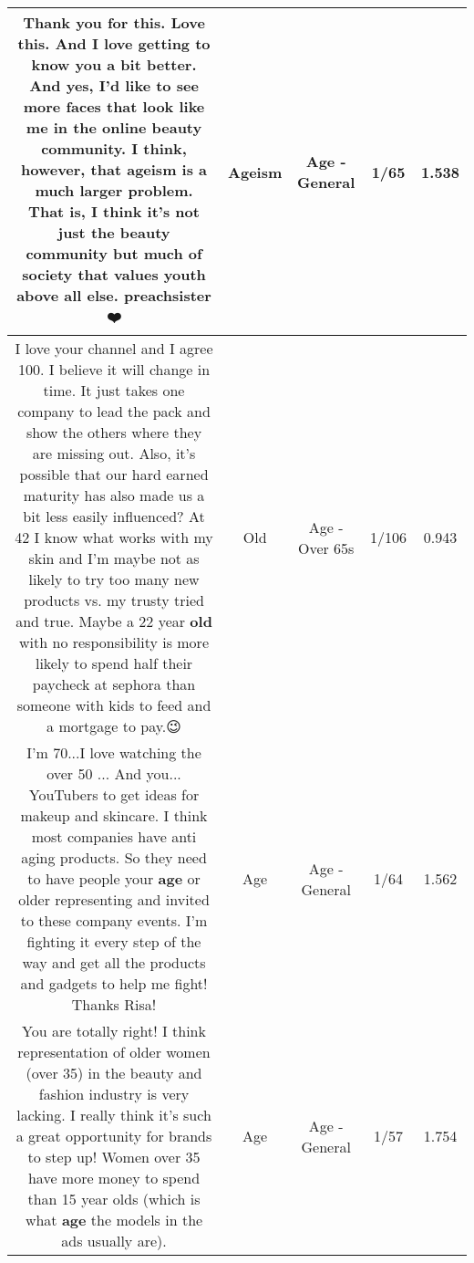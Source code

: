\documentclass[11pt]{article}
\newlength\mylength
\begin{document}
\begin{center}
\begin{longtable}{|C{.65\mylength}|C{.30\mylength}|C{.12\mylength}|C{.12\mylength}|C{.12\mylength}|}
  \small Thank you for this. Love this.  And I love getting to know you a bit better.  And yes, I'd like to see more faces that look like me in the online beauty community. I think, however, that \textbf{ageism} is a much larger problem. That is, I think it's not just the beauty community but much of society that values youth above all else. preachsister ❤️\normalsize   & Ageism & Age - General & 1/65 & 1.538 \\  \hline
  \small I love your channel and I agree 100.  I believe it will change in time. It just takes one company to lead the pack and show the others where they are missing out.  Also, it's possible that our hard earned maturity has also made us a bit less easily influenced?  At 42 I know what works with my skin and I'm maybe not as likely to try too many new products vs. my trusty tried and true. Maybe a 22 year \textbf{old} with no responsibility is more likely to spend half their paycheck at sephora than someone with kids to feed and a mortgage to pay.😉\normalsize   & Old & Age - Over 65s & 1/106 & 0.943 \\  \hline
  \small I'm 70...I love watching the over 50 ... And you... YouTubers to get ideas for makeup and skincare.  I think most companies have anti aging products. So they need to have people your \textbf{age} or older representing and invited to these company events. I'm fighting it every step of the way and get all the products and gadgets to help me fight! Thanks Risa!\normalsize   & Age & Age - General & 1/64 & 1.562 \\  \hline
  \small You are totally right! I think representation of older women (over 35) in the beauty and fashion industry is very lacking. I really think it's such a great opportunity for brands to step up! Women over 35 have more money to spend than 15 year olds (which is what \textbf{age} the models in the ads usually are).\normalsize   & Age & Age - General & 1/57 & 1.754 \\  \hline

\end{longtable}
\end{center}
\end{document}
